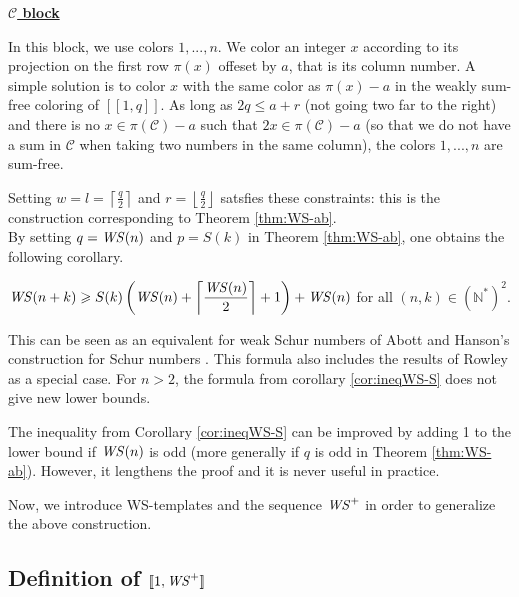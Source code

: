 \noindent \underline{\textbf{\(\mathcal{C}\) block}}
\par
In this block, we use colors \(1, ..., n\). We color an integer \(x\) according to its projection on the first row \(\pi(x)\) offeset by \(a\), 
that is its column number. A simple solution is to color \(x\) with the same color as \(\pi(x) - a\) in the weakly sum-free coloring of 
\([\![1,q]\!]\). As long as \(2q \leqslant a + r\) (not going two far to the right) and there is no \(x \in \pi(\mathcal{C}) - a\) such that 
\(2x \in \pi(\mathcal{C}) - a\) (so that we do not have a sum in \(\mathcal{C}\) when taking two numbers in the same column), 
the colors \(1, ..., n\) are sum-free.

Setting \(w = l = \left\lceil \displaystyle \frac{q}{2} \right\rceil\) and \(r = \left\lfloor \displaystyle \frac{q}{2} \right\rfloor\) satsfies these 
constraints: this is the construction corresponding to Theorem \ref{thm:WS-ab}. \\

By setting \(q = \mathit{WS} (n)\) and \(p = S(k)\) in Theorem \ref{thm:WS-ab}, one obtains the following corollary.

\begin{corollary}
\label{cor:ineqWS-S}
\(\mathit{WS} (n+k) \geqslant S(k) \left (\mathit{WS} (n) + \left \lceil \displaystyle \frac{\mathit{WS} (n)}{2} \right \rceil +1 \right) + \mathit{WS} (n)\)
for all \((n,k) \in (\mathbb{N}^*)^2\).
\end{corollary}

This can be seen as an equivalent for weak Schur numbers of Abott and Hanson's construction for Schur numbers 
\cite{AbbottHanson}. This formula also includes the results of Rowley \cite{RowleyWS} as a special case. For \(n>2\), 
the formula from corollary \ref{cor:ineqWS-S} does not give new lower bounds.

\begin{remark}
The inequality from Corollary \ref{cor:ineqWS-S} can be improved by adding 1 to the lower bound if \(\mathit{WS} (n)\) is odd (more generally if \(q\) is
odd in Theorem \ref{thm:WS-ab}). However, it lengthens the proof and it is never useful in practice.
\end{remark}
\par
Now, we introduce WS-templates and the sequence \(\mathit{WS}^+\) in order to generalize the above construction.

\subsection{Definition of \([\![ 1, \mathit{WS}^+ ]\!]\)}
\label{DefinitionWS+}

